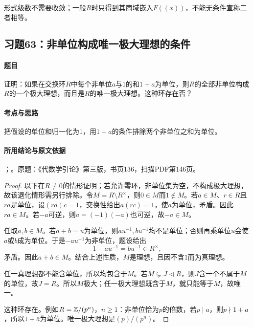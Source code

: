 形式级数不需要收敛；一般$R$时只得到其商域嵌入$F((x))$，不能无条件宣称二者相等。



\subsection{习题63：非单位构成唯一极大理想的条件}

\label{ex:3:63}

\paragraph{题目}

证明：如果在交换环$R$中每个非单位$a$与$1$的和$1+a$为单位，则$R$的全部非单位构成$R$的一个极大理想，而且是$R$的唯一极大理想。这种环存在否？

\paragraph{考点与思路}

把假设的单位和归一化为$1$，用$1+a$的条件排除两个非单位之和为单位。

\paragraph{所用结论与原文依据}

；。原题：《代数学引论》第三版，书页136，扫描PDF第146页。


\begin{proof}

以下在$R\ne0$的情形证明；若允许零环，非单位集为空，不构成极大理想，故该退化情形需另行排除。令$M=R\setminus R^\times$，则$0\in M$而$1\notin M$。若$a\in M$、$r\in R$且$ra$是单位，设$(ra)c=1$，交换性给出$a(rc)=1$，使$a$为单位，矛盾。因此$ra\in M$。若$-a$可逆，则$a=(-1)(-a)$也可逆，故$-a\in M$。

任取$a,b\in M$。若$a+b=u$为单位，则$au^{-1},bu^{-1}$均不是单位；否则再乘单位$u$会使$a$或$b$成为单位。于是$-au^{-1}$为非单位，题设给出
\[
1-au^{-1}=bu^{-1}\in R^\times,
\]
矛盾。因此$a+b\in M$。结合上述性质，$M$是理想，且因不含$1$而为真理想。

任一真理想都不能含单位，所以均包含于$M$。若$M\subsetneq J\lhd R$，则$J$含一个不属于$M$的单位，故$J=R$。所以$M$极大；任一极大理想既含于$M$，就只能等于$M$，故唯一。

这种环存在。例如$R=\mathbb Z/(p^n)$，$n\ge1$：非单位恰为$p$的倍数，若$p\mid a$，则$p\nmid1+a$，所以$1+\bar a$为单位。唯一极大理想是$(p)/(p^n)$。

\end{proof}

